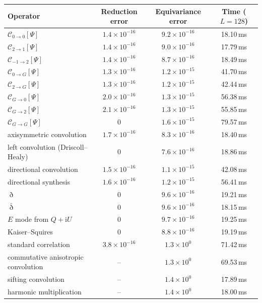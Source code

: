 \begin{tabular}{lccc}
\toprule
Operator & Reduction error & Equivariance error & Time ($L=128$) \\
\midrule
$\mathcal{C}_{0\to0}[\Psi]$ & $1.4\times10^{-16}$ & $9.2\times10^{-16}$ & 18.10\,ms \\
$\mathcal{C}_{2\to1}[\Psi]$ & $1.4\times10^{-16}$ & $9.0\times10^{-16}$ & 17.79\,ms \\
$\mathcal{C}_{-1\to2}[\Psi]$ & $1.4\times10^{-16}$ & $8.7\times10^{-16}$ & 18.49\,ms \\
$\mathcal{C}_{0\to G}[\Psi]$ & $1.3\times10^{-16}$ & $1.2\times10^{-15}$ & 41.70\,ms \\
$\mathcal{C}_{2\to G}[\Psi]$ & $1.3\times10^{-16}$ & $1.2\times10^{-15}$ & 42.44\,ms \\
$\mathcal{C}_{G\to0}[\Psi]$ & $2.0\times10^{-16}$ & $1.3\times10^{-15}$ & 56.38\,ms \\
$\mathcal{C}_{G\to2}[\Psi]$ & $2.1\times10^{-16}$ & $1.3\times10^{-15}$ & 55.85\,ms \\
$\mathcal{C}_{G\to G}[\Psi]$ & $0$ & $1.6\times10^{-15}$ & 79.57\,ms \\
axisymmetric convolution & $1.7\times10^{-16}$ & $8.3\times10^{-16}$ & 18.40\,ms \\
left convolution (Driscoll--Healy) & $0$ & $7.6\times10^{-16}$ & 18.86\,ms \\
directional convolution & $1.5\times10^{-16}$ & $1.1\times10^{-15}$ & 42.08\,ms \\
directional synthesis & $1.6\times10^{-16}$ & $1.2\times10^{-15}$ & 56.41\,ms \\
$\eth$ & $0$ & $9.6\times10^{-16}$ & 19.21\,ms \\
$\bar\eth$ & $0$ & $9.6\times10^{-16}$ & 18.15\,ms \\
$E$ mode from $Q + \mathrm{i}U$ & $0$ & $9.7\times10^{-16}$ & 19.25\,ms \\
Kaiser--Squires & $0$ & $8.8\times10^{-16}$ & 19.19\,ms \\
standard correlation & $3.8\times10^{-16}$ & $1.3\times10^{0}$ & 71.42\,ms \\
commutative anisotropic convolution & -- & $1.3\times10^{0}$ & 69.53\,ms \\
sifting convolution & -- & $1.4\times10^{0}$ & 17.89\,ms \\
harmonic multiplication & -- & $1.4\times10^{0}$ & 18.00\,ms \\
\bottomrule
\end{tabular}
